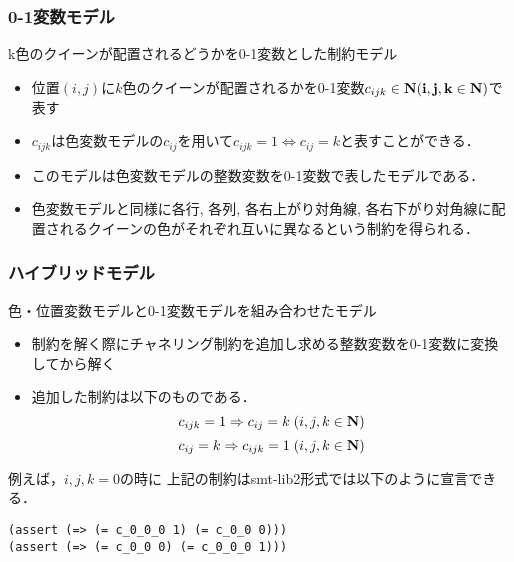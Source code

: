 \begin{frame}\small
    \frametitle{0-1変数モデル}
    \alert{k色のクイーンが配置されるどうか}を0-1変数とした制約モデル\\
    \setlength{\abovedisplayskip}{1pt} %
    \setlength{\belowdisplayskip}{1pt} %
    \begin{block}{}
        \begin{itemize}
            \item 位置$(i, j)$に$k$色のクイーンが配置されるかを0-1変数$c_{ijk} \in \bf N (i, j, k \in \bf N)$で表す
            \item $c_{ijk}$は色変数モデルの$c_{ij}$を用いて$c_{ijk}=1 \Leftrightarrow c_{ij}=k$と表すことができる．
            \item このモデルは色変数モデルの整数変数を0-1変数で表したモデルである．
            \item 色変数モデルと同様に\alert{各行}, \alert{各列}, \alert{各右上がり対角線}, \alert{各右下がり対角線}に配置されるクイーンの色がそれぞれ互いに異なるという制約を得られる．
        \end{itemize}
    \end{block}
\end{frame}


\begin{frame}[fragile]\small
    \frametitle{ハイブリッドモデル}
    色・位置変数モデルと0-1変数モデルを組み合わせたモデル\\
    \setlength{\abovedisplayskip}{1pt} %
    \setlength{\belowdisplayskip}{1pt} %
    \begin{block}{}
        \begin{itemize}
            \item \distinct 制約を解く際にチャネリング制約を追加し求める整数変数を0-1変数に変換してから解く
            \item 追加した制約は以下のものである．
                $$ c_{ijk}=1 \Rightarrow c_{ij}=k \; (i,j,k \in \bf N)$$
                $$ c_{ij}=k \Rightarrow c_{ijk}=1 \; (i,j,k \in \bf N)$$
        \end{itemize}
    \end{block}
    例えば，$i,j,k=0$の時に
    上記の制約はsmt-lib2形式では以下のように宣言できる．
    \begin{exampleblock}{}
\begin{verbatim}
(assert (=> (= c_0_0_0 1) (= c_0_0 0)))
(assert (=> (= c_0_0 0) (= c_0_0_0 1)))
\end{verbatim}
    \end{exampleblock}
\end{frame}

